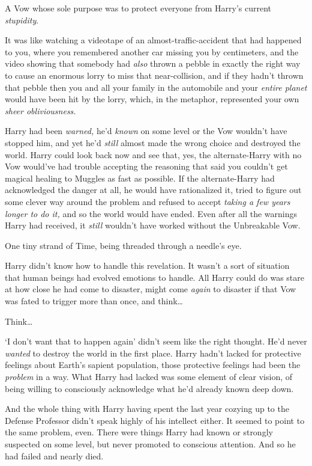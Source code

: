 A Vow whose sole purpose was to protect everyone from Harry's current
\emph{stupidity}.

It was like watching a videotape of an almost-traffic-accident that had
happened to you, where you remembered another car missing you by centimeters,
and the video showing that somebody had \emph{also} thrown a pebble in exactly
the right way to cause an enormous lorry to miss that near-collision, and if
they hadn't thrown that pebble then you and all your family in the automobile
and your \emph{entire planet} would have been hit by the lorry, which, in the
metaphor, represented your own \emph{sheer obliviousness.}

Harry had been \emph{warned,} he'd \emph{known} on some level or the Vow
wouldn't have stopped him, and yet he'd \emph{still} almost made the wrong
choice and destroyed the world. Harry could look back now and see that, yes,
the alternate-Harry with no Vow would've had trouble accepting the reasoning
that said you couldn't get magical healing to Muggles as fast as possible. If
the alternate-Harry had acknowledged the danger at all, he would have
rationalized it, tried to figure out some clever way around the problem and
refused to accept \emph{taking a few years longer to do it,} and so the world
would have ended. Even after all the warnings Harry had received, it
\emph{still} wouldn't have worked without the Unbreakable Vow.

One tiny strand of Time, being threaded through a needle's eye.

Harry didn't know how to handle this revelation. It wasn't a sort of situation
that human beings had evolved emotions to handle. All Harry could do was stare
at how close he had come to disaster, might come \emph{again} to disaster if
that Vow was fated to trigger more than once, and think{\ldots}

Think{\ldots}

`I don't want that to happen again' didn't seem like the right thought. He'd
never \emph{wanted} to destroy the world in the first place. Harry hadn't
lacked for protective feelings about Earth's sapient population, those
protective feelings had been the \emph{problem} in a way. What Harry had lacked
was some element of clear vision, of being willing to consciously acknowledge
what he'd already known deep down.

And the whole thing with Harry having spent the last year cozying up to the
Defense Professor didn't speak highly of his intellect either. It seemed to
point to the same problem, even. There were things Harry had known or strongly
suspected on some level, but never promoted to conscious attention. And so he
had failed and nearly died.

